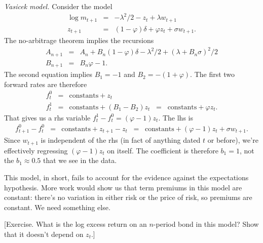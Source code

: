 \documentclass[11pt]{article}
\begin{document}
{\it Vasicek model.\/}
Consider the model
\begin{eqnarray*}
    \log m_{t+1} &=& - \lambda^2/2 - z_t + \lambda w_{t+1} \\
         z_{t+1} &=& (1-\varphi) \delta + \varphi z_t + \sigma w_{t+1} .
\end{eqnarray*}
The no-arbitrage theorem implies the recursions
\begin{eqnarray*}
    A_{n+1} &=& A_n + B_n (1-\varphi) \delta - \lambda^2/2 + (\lambda + B_n \sigma)^2/2 \\
    B_{n+1} &=& B_n \varphi - 1 .
\end{eqnarray*}
The second equation implies
$B_1 = -1$ and $B_2 = -(1+\varphi)$.
The first two forward rates are therefore
\begin{eqnarray*}
    f^0_t &=& \mbox{constants} + z_t \\
    f^1_t &=& \mbox{constants} + (B_1-B_2) z_t
            \;\;=\;\; \mbox{constants} + \varphi z_t .
\end{eqnarray*}
That gives us a rhs variable $f^1_t - f^0_t = (\varphi-1)z_t$.
The lhs is
\begin{eqnarray*}
    f^0_{t+1} - f^0_t &=& \mbox{constants} + z_{t+1} - z_t
                    \;\;=\;\; \mbox{constants} + (\varphi-1) z_t + \sigma w_{t+1}.
\end{eqnarray*}
Since $w_{t+1}$ is independent of the rhs (in fact of anything dated $t$ or before),
we're effectively regressing $(\varphi-1) z_t$
on itself.
The coefficient is therefore $b_1 = 1$, not the $b_1 \approx 0.5$ that we see in the data.

This model, in short, fails to account for the evidence against the expectations
hypothesis.
More work would show us that term premiums in this model are constant:
there's no variation in either risk or the price of risk,
so premiums are constant.
We need something else.

[Exercise.
What is the log excess return on an $n$-period bond in this model?
Show that it doesn't depend on $z_t$.]
\end{document}
